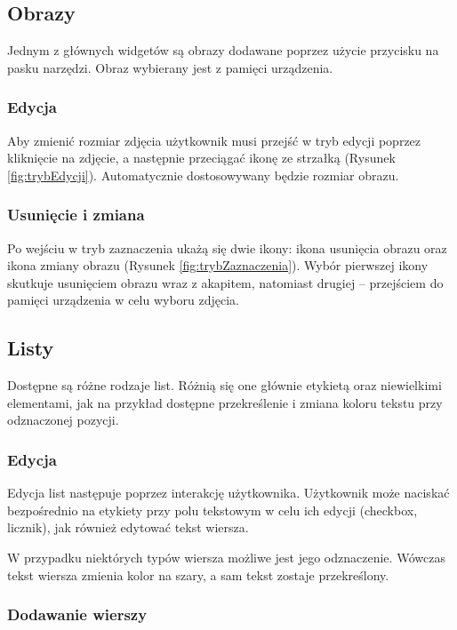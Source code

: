 \subsection{Obrazy}

Jednym z głównych widgetów są obrazy dodawane poprzez użycie przycisku na pasku narzędzi. Obraz wybierany jest z pamięci urządzenia.

\subsubsection{Edycja}

Aby zmienić rozmiar zdjęcia użytkownik musi przejść w tryb edycji poprzez kliknięcie na zdjęcie, a następnie przeciągać ikonę ze strzałką (Rysunek \ref{fig:trybEdycji}). Automatycznie dostosowywany będzie rozmiar obrazu.

\subsubsection{Usunięcie i zmiana}

Po wejściu w tryb zaznaczenia ukażą się dwie ikony: ikona usunięcia obrazu oraz ikona zmiany obrazu (Rysunek \ref{fig:trybZaznaczenia}).
Wybór pierwszej ikony skutkuje usunięciem obrazu wraz z akapitem, natomiast drugiej -- przejściem do pamięci urządzenia w celu wyboru zdjęcia.

\subsection{Listy}

Dostępne są różne rodzaje list. Różnią się one głównie etykietą oraz niewielkimi elementami, jak na przykład dostępne przekreślenie i zmiana koloru tekstu przy odznaczonej pozycji.

\subsubsection{Edycja}

Edycja list następuje poprzez interakcję użytkownika. Użytkownik może naciskać bezpośrednio na etykiety przy polu tekstowym w celu ich edycji (checkbox, licznik), jak również edytować tekst wiersza.

W przypadku niektórych typów wiersza możliwe jest jego odznaczenie. Wówczas tekst wiersza zmienia kolor na szary, a sam tekst zostaje przekreślony.

\subsubsection{Dodawanie wierszy}

